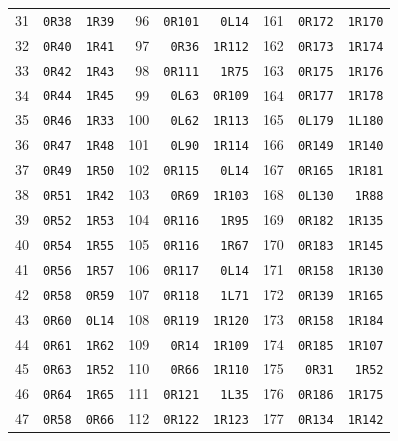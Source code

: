 \begin{center}
\begin{tabular}{rrr@{\hspace{17pt}}rrr@{\hspace{17pt}}rrr}
31 & \texttt{0R38} & \texttt{1R39} & 96 & \texttt{0R101} & \texttt{0L14} & 161 & \texttt{0R172} & \texttt{1R170}\\
32 & \texttt{0R40} & \texttt{1R41} & 97 & \texttt{0R36} & \texttt{1R112} & 162 & \texttt{0R173} & \texttt{1R174}\\
33 & \texttt{0R42} & \texttt{1R43} & 98 & \texttt{0R111} & \texttt{1R75} & 163 & \texttt{0R175} & \texttt{1R176}\\
34 & \texttt{0R44} & \texttt{1R45} & 99 & \texttt{0L63} & \texttt{0R109} & 164 & \texttt{0R177} & \texttt{1R178}\\
35 & \texttt{0R46} & \texttt{1R33} & 100 & \texttt{0L62} & \texttt{1R113} & 165 & \texttt{0L179} & \texttt{1L180}\\
36 & \texttt{0R47} & \texttt{1R48} & 101 & \texttt{0L90} & \texttt{1R114} & 166 & \texttt{0R149} & \texttt{1R140}\\
37 & \texttt{0R49} & \texttt{1R50} & 102 & \texttt{0R115} & \texttt{0L14} & 167 & \texttt{0R165} & \texttt{1R181}\\
38 & \texttt{0R51} & \texttt{1R42} & 103 & \texttt{0R69} & \texttt{1R103} & 168 & \texttt{0L130} & \texttt{1R88}\\
39 & \texttt{0R52} & \texttt{1R53} & 104 & \texttt{0R116} & \texttt{1R95} & 169 & \texttt{0R182} & \texttt{1R135}\\
40 & \texttt{0R54} & \texttt{1R55} & 105 & \texttt{0R116} & \texttt{1R67} & 170 & \texttt{0R183} & \texttt{1R145}\\
41 & \texttt{0R56} & \texttt{1R57} & 106 & \texttt{0R117} & \texttt{0L14} & 171 & \texttt{0R158} & \texttt{1R130}\\
42 & \texttt{0R58} & \texttt{0R59} & 107 & \texttt{0R118} & \texttt{1L71} & 172 & \texttt{0R139} & \texttt{1R165}\\
43 & \texttt{0R60} & \texttt{0L14} & 108 & \texttt{0R119} & \texttt{1R120} & 173 & \texttt{0R158} & \texttt{1R184}\\
44 & \texttt{0R61} & \texttt{1R62} & 109 & \texttt{0R14} & \texttt{1R109} & 174 & \texttt{0R185} & \texttt{1R107}\\
45 & \texttt{0R63} & \texttt{1R52} & 110 & \texttt{0R66} & \texttt{1R110} & 175 & \texttt{0R31} & \texttt{1R52}\\
46 & \texttt{0R64} & \texttt{1R65} & 111 & \texttt{0R121} & \texttt{1L35} & 176 & \texttt{0R186} & \texttt{1R175}\\
47 & \texttt{0R58} & \texttt{0R66} & 112 & \texttt{0R122} & \texttt{1R123} & 177 & \texttt{0R134} & \texttt{1R142}\\

\end{tabular}
\end{center}
